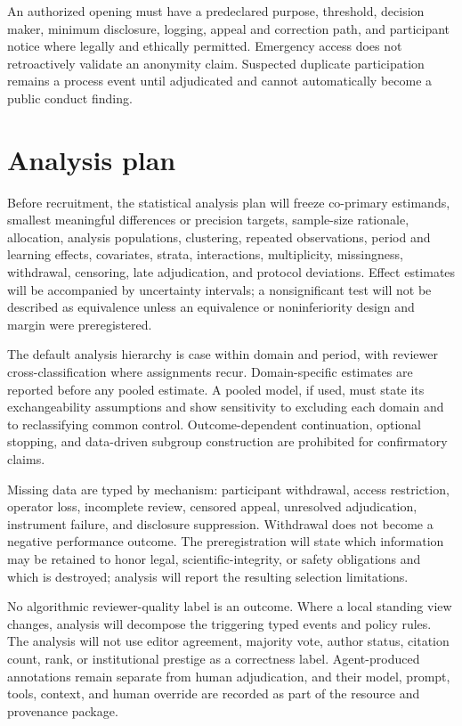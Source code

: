 \documentclass[11pt]{article}
\begin{document}
An authorized opening must have a predeclared purpose, threshold, decision maker,
minimum disclosure, logging, appeal and correction path, and participant notice
where legally and ethically permitted. Emergency access does not retroactively
validate an anonymity claim. Suspected duplicate participation remains a process
event until adjudicated and cannot automatically become a public conduct finding.

\section{Analysis plan}

Before recruitment, the statistical analysis plan will freeze co-primary
estimands, smallest meaningful differences or precision targets, sample-size
rationale, allocation, analysis populations, clustering, repeated observations,
period and learning effects, covariates, strata, interactions, multiplicity,
missingness, withdrawal, censoring, late adjudication, and protocol deviations.
Effect estimates will be accompanied by uncertainty intervals; a nonsignificant
test will not be described as equivalence unless an equivalence or noninferiority
design and margin were preregistered.

The default analysis hierarchy is case within domain and period, with reviewer
cross-classification where assignments recur. Domain-specific estimates are
reported before any pooled estimate. A pooled model, if used, must state its
exchangeability assumptions and show sensitivity to excluding each domain and to
reclassifying common control. Outcome-dependent continuation, optional stopping,
and data-driven subgroup construction are prohibited for confirmatory claims.

Missing data are typed by mechanism: participant withdrawal, access restriction,
operator loss, incomplete review, censored appeal, unresolved adjudication,
instrument failure, and disclosure suppression. Withdrawal does not become a
negative performance outcome. The preregistration will state which information may
be retained to honor legal, scientific-integrity, or safety obligations and which
is destroyed; analysis will report the resulting selection limitations.

No algorithmic reviewer-quality label is an outcome. Where a local standing view
changes, analysis will decompose the triggering typed events and policy rules. The
analysis will not use editor agreement, majority vote, author status, citation
count, rank, or institutional prestige as a correctness label. Agent-produced
annotations remain separate from human adjudication, and their model, prompt,
tools, context, and human override are recorded as part of the resource and
provenance package.
\end{document}
